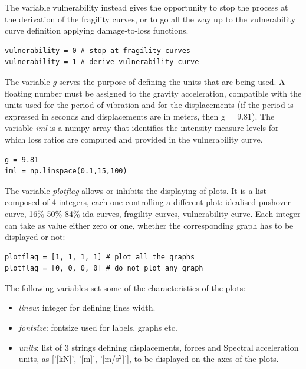 The variable vulnerability instead gives the opportunity to stop the process at the derivation of the fragility curves, or to go all the way up to the vulnerability curve definition applying damage-to-loss functions.

\begin{Verbatim}[frame=single, commandchars=\\\{\}, samepage=true]
vulnerability = 0 # stop at fragility curves 
vulnerability = 1 # derive vulnerability curve
\end{Verbatim}

The variable \textit{g} serves the purpose of defining the units that are being used. A floating number must be assigned to the gravity acceleration, compatible with the units used for the period of vibration and for the displacements (if the period is expressed in seconds and displacements are in meters, then g = 9.81). The variable \textit{iml} is a numpy array that identifies the intensity measure levels for which loss ratios are computed and provided in the vulnerability curve.

\begin{Verbatim}[frame=single, commandchars=\\\{\}, samepage=true]
g = 9.81
iml = np.linspace(0.1,15,100)
\end{Verbatim}

The variable \textit{plotflag} allows or inhibits the displaying of plots. It is a list composed of 4 integers, each one controlling a different plot: idealised pushover curve, 16\%-50\%-84\% ida curves, fragility curves, vulnerability curve. Each integer can take as value either zero or one, whether the corresponding graph has to be displayed or not:

\begin{Verbatim}[frame=single, commandchars=\\\{\}, samepage=true]
plotflag = [1, 1, 1, 1] # plot all the graphs
plotflag = [0, 0, 0, 0] # do not plot any graph
\end{Verbatim}

The following variables set some of the characteristics of the plots:

\begin{itemize}
\item \textit{linew}: integer for defining lines width.
\item \textit{fontsize}: fontsize used for labels, graphs etc.
\item \textit{units}: list of 3 strings defining displacements, forces and Spectral acceleration units, as ['[kN]', '[m]', '[m/s$^2$]'], to be displayed on the axes of the plots.
\end{itemize}

